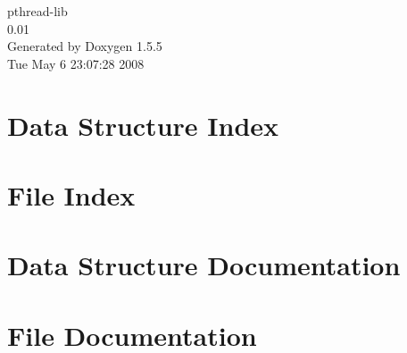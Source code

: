 \documentclass[a4paper]{book}
\begin{document}
\begin{titlepage}
\vspace*{7cm}
\begin{center}
{\Large pthread-lib \\[1ex]\large 0.01 }\\
\vspace*{1cm}
{\large Generated by Doxygen 1.5.5}\\
\vspace*{0.5cm}
{\small Tue May 6 23:07:28 2008}\\
\end{center}
\end{titlepage}
\clearemptydoublepage
{}
\tableofcontents
\clearemptydoublepage
{}
\chapter{Data Structure Index}

\chapter{File Index}

\chapter{Data Structure Documentation}



\chapter{File Documentation}









\printindex
\end{document}
